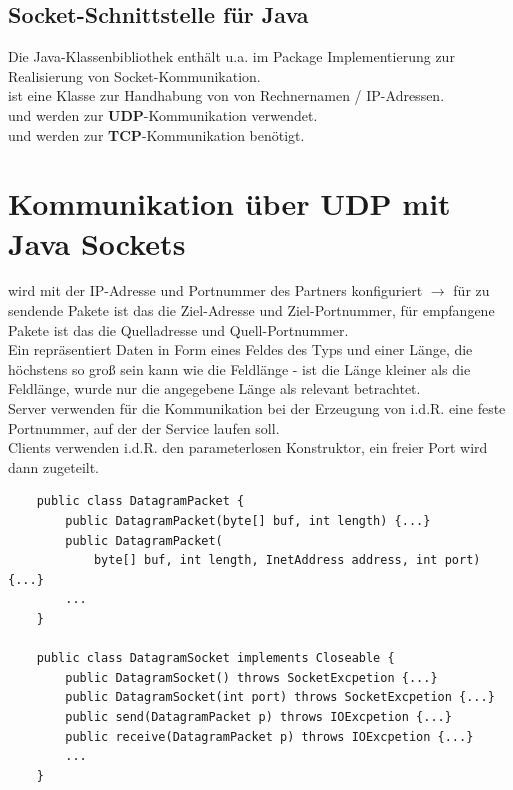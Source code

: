 \subsection{Socket-Schnittstelle für Java}

Die Java-Klassenbibliothek enthält u.a. im Package  Implementierung zur Realisierung von Socket-Kommunikation.\\

\noindent
{} ist eine Klasse zur Handhabung von von Rechnernamen / IP-Adressen.\\

\noindent
{} und  werden zur \textbf{UDP}-Kommunikation verwendet.\\

\noindent
{} und  werden zur \textbf{TCP}-Kommunikation benötigt.


\section{Kommunikation über UDP mit Java Sockets}

 wird mit der IP-Adresse und Portnummer des Partners konfiguriert $\rightarrow$ für zu sendende Pakete ist das die Ziel-Adresse und Ziel-Portnummer, für empfangene Pakete ist das die Quelladresse und Quell-Portnummer.\\

\noindent
Ein  repräsentiert Daten in Form eines Feldes des Typs  und einer Länge, die höchstens so groß sein kann wie die Feldlänge - ist die Länge kleiner als die Feldlänge, wurde nur die angegebene Länge als relevant betrachtet.\\

\noindent
Server verwenden für die Kommunikation bei der Erzeugung von  i.d.R. eine feste Portnummer, auf der der Service laufen soll.\\
Clients verwenden i.d.R. den parameterlosen Konstruktor, ein freier Port wird dann zugeteilt.

\begin{verbatim}
    public class DatagramPacket {
        public DatagramPacket(byte[] buf, int length) {...}
        public DatagramPacket(
            byte[] buf, int length, InetAddress address, int port) {...}
        ...
    }

    public class DatagramSocket implements Closeable {
        public DatagramSocket() throws SocketExcpetion {...}
        public DatagramSocket(int port) throws SocketExcpetion {...}
        public send(DatagramPacket p) throws IOExcpetion {...}
        public receive(DatagramPacket p) throws IOExcpetion {...}
        ...
    }
\end{verbatim}\\

